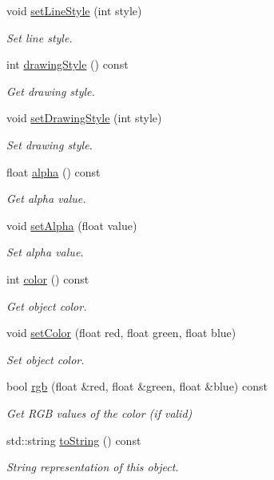 \begin{DoxyCompactItemize}
void \hyperlink{class_d_d4hep_1_1_geometry_1_1_vis_attr_ad86fa3158adc9cb58bdf7d72da8f1eee}{set\+Line\+Style} (int style)
\begin{DoxyCompactList}\small\item\em Set line style. \end{DoxyCompactList}\item 
int \hyperlink{class_d_d4hep_1_1_geometry_1_1_vis_attr_aec03c67138c881de29de1f03714d2fcf}{drawing\+Style} () const
\begin{DoxyCompactList}\small\item\em Get drawing style. \end{DoxyCompactList}\item 
void \hyperlink{class_d_d4hep_1_1_geometry_1_1_vis_attr_a37d208476b8631402fe4777061abfc81}{set\+Drawing\+Style} (int style)
\begin{DoxyCompactList}\small\item\em Set drawing style. \end{DoxyCompactList}\item 
float \hyperlink{class_d_d4hep_1_1_geometry_1_1_vis_attr_aa03d4b09f7e77bfa226e6e2f4c53c17e}{alpha} () const
\begin{DoxyCompactList}\small\item\em Get alpha value. \end{DoxyCompactList}\item 
void \hyperlink{class_d_d4hep_1_1_geometry_1_1_vis_attr_aeca9848b297213098eac1fd882fd7680}{set\+Alpha} (float value)
\begin{DoxyCompactList}\small\item\em Set alpha value. \end{DoxyCompactList}\item 
int \hyperlink{class_d_d4hep_1_1_geometry_1_1_vis_attr_a31539af01a3377eae58fb6b1286b8eee}{color} () const
\begin{DoxyCompactList}\small\item\em Get object color. \end{DoxyCompactList}\item 
void \hyperlink{class_d_d4hep_1_1_geometry_1_1_vis_attr_aa9f0dec964e94cbb6df397e242ac57b5}{set\+Color} (float red, float green, float blue)
\begin{DoxyCompactList}\small\item\em Set object color. \end{DoxyCompactList}\item 
bool \hyperlink{class_d_d4hep_1_1_geometry_1_1_vis_attr_aa58eeb502a6bc084de091590930e7827}{rgb} (float \&red, float \&green, float \&blue) const
\begin{DoxyCompactList}\small\item\em Get R\+GB values of the color (if valid) \end{DoxyCompactList}\item 
std\+::string \hyperlink{class_d_d4hep_1_1_geometry_1_1_vis_attr_af371a9c2991680745a8e48be921807d1}{to\+String} () const
\begin{DoxyCompactList}\small\item\em String representation of this object. \end{DoxyCompactList}\end{DoxyCompactItemize}
